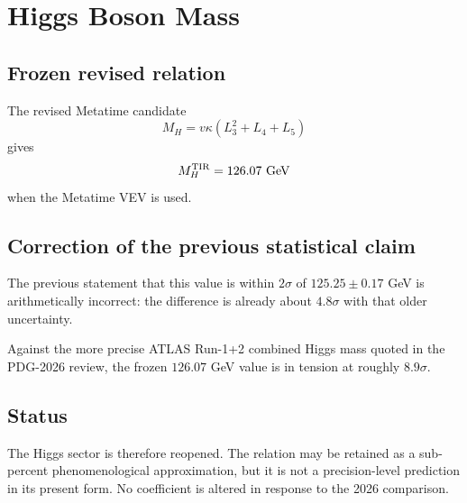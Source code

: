 \chapter{Higgs Boson Mass}
\label{ch:higgs_mass}

\section{Frozen revised relation}
The revised Metatime candidate
\[
M_H=v\kappa(L_3^2+L_4+L_5)
\]
gives
\[
M_H^{\rm TIR}=126.07\ {\rm GeV}
\]
when the Metatime VEV is used.

\section{Correction of the previous statistical claim}
The previous statement that this value is within $2\sigma$ of
$125.25\pm0.17$ GeV is arithmetically incorrect: the difference is already
about $4.8\sigma$ with that older uncertainty.

Against the more precise ATLAS Run-1+2 combined Higgs mass quoted in the
PDG-2026 review, the frozen $126.07$ GeV value is in tension at roughly
$8.9\sigma$.

\section{Status}
The Higgs sector is therefore reopened. The relation may be retained as a
sub-percent phenomenological approximation, but it is not a precision-level
prediction in its present form. No coefficient is altered in response to the
2026 comparison.
